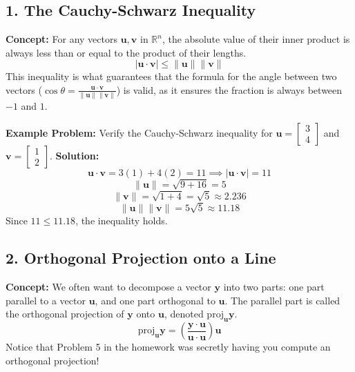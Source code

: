\documentclass[11pt, letterpaper]{article}
\theoremstyle{definition}
\theoremstyle{remark}
\newcommand{\R}{\mathbb{R}}
\begin{document}
\subsection{1. The Cauchy-Schwarz Inequality}
\textbf{Concept:} For any vectors $\mathbf{u}, \mathbf{v}$ in $\R^n$, the absolute value of their inner product is always less than or equal to the product of their lengths.
\[ |\mathbf{u} \cdot \mathbf{v}| \le \|\mathbf{u}\| \|\mathbf{v}\| \]
This inequality is what guarantees that the formula for the angle between two vectors ($\cos \theta = \frac{\mathbf{u} \cdot \mathbf{v}}{\|\mathbf{u}\|\|\mathbf{v}\|}$) is valid, as it ensures the fraction is always between $-1$ and $1$.

\textbf{Example Problem:} Verify the Cauchy-Schwarz inequality for $\mathbf{u} = \begin{bmatrix} 3 \\ 4 \end{bmatrix}$ and $\mathbf{v} = \begin{bmatrix} 1 \\ 2 \end{bmatrix}$.
\textbf{Solution:}
\[ \mathbf{u} \cdot \mathbf{v} = 3(1) + 4(2) = 11 \implies |\mathbf{u} \cdot \mathbf{v}| = 11 \]
\[ \|\mathbf{u}\| = \sqrt{9 + 16} = 5 \]
\[ \|\mathbf{v}\| = \sqrt{1 + 4} = \sqrt{5} \approx 2.236 \]
\[ \|\mathbf{u}\|\|\mathbf{v}\| = 5\sqrt{5} \approx 11.18 \]
Since $11 \le 11.18$, the inequality holds.

\subsection{2. Orthogonal Projection onto a Line}
\textbf{Concept:} We often want to decompose a vector $\mathbf{y}$ into two parts: one part parallel to a vector $\mathbf{u}$, and one part orthogonal to $\mathbf{u}$. The parallel part is called the orthogonal projection of $\mathbf{y}$ onto $\mathbf{u}$, denoted $\text{proj}_{\mathbf{u}} \mathbf{y}$.
\[ \text{proj}_{\mathbf{u}} \mathbf{y} = \left( \frac{\mathbf{y} \cdot \mathbf{u}}{\mathbf{u} \cdot \mathbf{u}} \right) \mathbf{u} \]
Notice that Problem 5 in the homework was secretly having you compute an orthogonal projection!

\begin{center}
\end{center}
\end{document}
